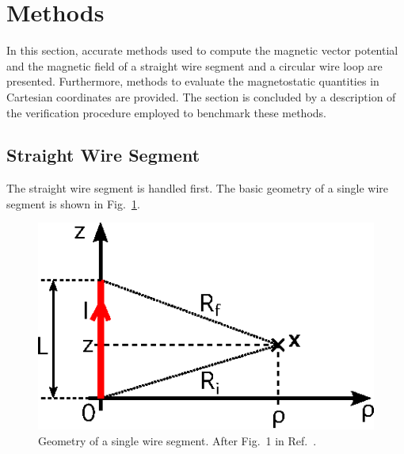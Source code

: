 \section{Methods}
\label{sec:methods}
In this section, accurate methods used to compute the magnetic vector potential and the magnetic field
of a straight wire segment and a circular wire loop are presented.
Furthermore, methods to evaluate the magnetostatic quantities in Cartesian coordinates are provided.
The section is concluded by a description of the verification procedure
employed to benchmark these methods.

\subsection{Straight Wire Segment}
The straight wire segment is handled first.
The basic geometry of a single wire segment is shown in Fig.~\ref{fig:straightWireSegment}.
\begin{figure}[htbp]
 \centering
 \includegraphics{img/straightWireSegment.eps}
 \caption{Geometry of a single wire segment. After Fig.~1 in Ref.~\cite{hanson_hirshman_2002}.}
 \label{fig:straightWireSegment}
\end{figure}

